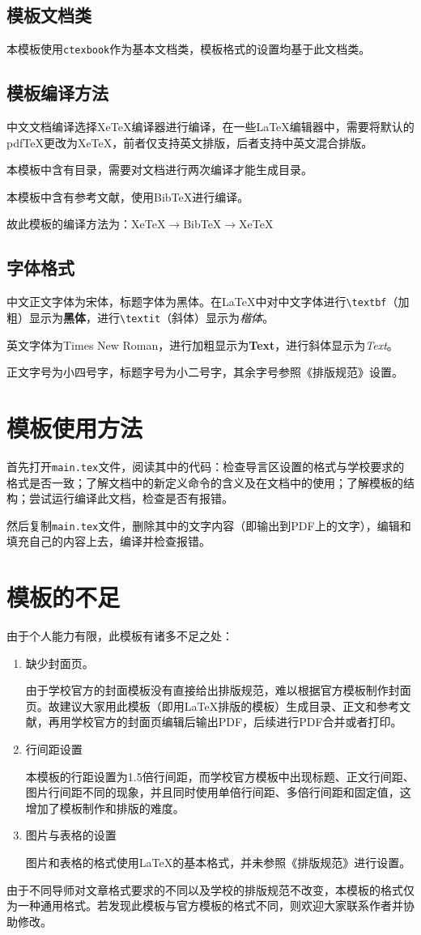 \documentclass[oneside,zihao=-4]{ctexbook}
\begin{document}
\subsection{模板文档类}
本模板使用\texttt{ctexbook}作为基本文档类，模板格式的设置均基于此文档类。
\subsection{模板编译方法}
中文文档编译选择Xe\TeX{}编译器进行编译，在一些\LaTeX{}编辑器中，需要将默认的pdf\TeX{}更改为Xe\TeX{}，前者仅支持英文排版，后者支持中英文混合排版。\par
本模板中含有目录，需要对文档进行两次编译才能生成目录。\par
本模板中含有参考文献，使用Bib\TeX{}进行编译。\par
故此模板的编译方法为：Xe\TeX{}$\to$Bib\TeX{}$\to$Xe\TeX{}
\subsection{字体格式}
中文正文字体为宋体，标题字体为黑体。在\LaTeX{}中对中文字体进行\texttt{\textbackslash textbf}（加粗）显示为\textbf{黑体}，进行\texttt{\textbackslash textit}（斜体）显示为\textit{楷体}。\par
英文字体为Times New Roman，进行加粗显示为\textbf{Text}，进行斜体显示为\textit{Text}。\par
正文字号为小四号字，标题字号为小二号字，其余字号参照《排版规范》设置。
\section{模板使用方法}
首先打开\texttt{main.tex}文件，阅读其中的代码：检查导言区设置的格式与学校要求的格式是否一致；了解文档中的新定义命令的含义及在文档中的使用；了解模板的结构；尝试运行编译此文档，检查是否有报错。\par
然后复制\texttt{main.tex}文件，删除其中的文字内容（即输出到PDF上的文字），编辑和填充自己的内容上去，编译并检查报错。
\section{模板的不足}
由于个人能力有限，此模板有诸多不足之处：
\begin{enumerate}
  \item 缺少封面页。\par
  \qquad 由于学校官方的封面模板没有直接给出排版规范，难以根据官方模板制作封面页。故建议大家用此模板（即用\LaTeX{}排版的模板）生成目录、正文和参考文献，再用学校官方的封面页编辑后输出PDF，后续进行PDF合并或者打印。
  \item 行间距设置\par
  \qquad 本模板的行距设置为1.5倍行间距，而学校官方模板中出现标题、正文行间距、图片行间距不同的现象，并且同时使用单倍行间距、多倍行间距和固定值，这增加了模板制作和排版的难度。
  \item 图片与表格的设置\par
  \qquad 图片和表格的格式使用\LaTeX{}的基本格式，并未参照《排版规范》进行设置。
\end{enumerate}\par
由于不同导师对文章格式要求的不同以及学校的排版规范不改变，本模板的格式仅为一种通用格式。若发现此模板与官方模板的格式不同，则欢迎大家联系作者并协助修改。
\end{document}
